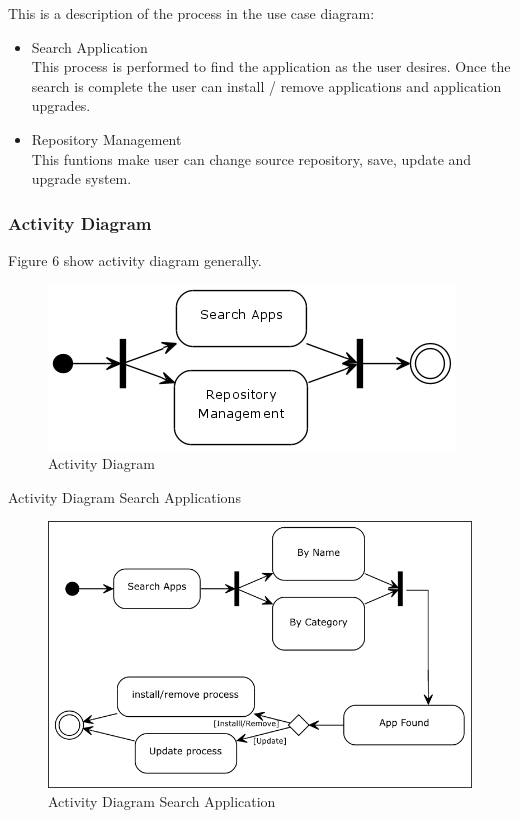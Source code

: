 \documentclass[conference, letterpaper]{IEEEtran}
\begin{document}
This is a description of the process in the use case diagram:
\begin{itemize}
\item Search Application\\
This process is performed to find the application as the user desires. Once the search is complete the user can install / remove applications and application upgrades.
\item Repository Management\\
This funtions make user can change source repository, save, update and upgrade system.
\end{itemize}

\subsubsection{Activity Diagram}
Figure 6 show activity diagram generally.

\begin{figure}[hbtp]
\centering
\includegraphics[scale=0.7]{image/ActivityDiagram.png}
\caption{Activity Diagram}
\end{figure}

Activity Diagram Search Applications

\begin{figure}[hbtp]
\centering
\includegraphics[scale=0.5]{image/ADSearchApp.png}
\caption{Activity Diagram Search Application}
\end{figure}
\end{document}
